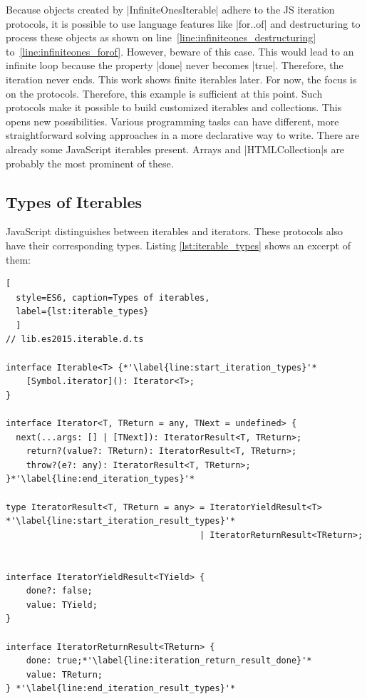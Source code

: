 Because objects created by |InfiniteOnesIterable| adhere to the JS iteration
protocols, it is possible to use language features like |for..of| and
destructuring to process these objects as shown on
line~\ref{line:infiniteones_destructuring} to~\ref{line:infiniteones_forof}.
However, beware of this case. This would lead to an infinite loop because the
property |done| never becomes |true|. Therefore, the iteration never ends. This
work shows finite iterables later. For now, the focus is on the protocols.
Therefore, this example is sufficient at this point.
\newline
Such protocols make it possible to build customized iterables and
collections. This opens new possibilities. Various programming tasks can have 
different, more straightforward solving approaches in a more declarative way to
write.
There are already some JavaScript iterables present. Arrays and
|HTMLCollection|s are probably the most prominent of these.

\subsection{Types of Iterables}
\label{sub:Types of Iterables}
JavaScript distinguishes between iterables and iterators. These
protocols also have their corresponding types. Listing \ref{lst:iterable_types}
shows an excerpt of them:

\begin{lstlisting}[
  style=ES6, caption=Types of iterables,
  label={lst:iterable_types}
  ]
// lib.es2015.iterable.d.ts

interface Iterable<T> {*'\label{line:start_iteration_types}'*
    [Symbol.iterator](): Iterator<T>;
}

interface Iterator<T, TReturn = any, TNext = undefined> {
  next(...args: [] | [TNext]): IteratorResult<T, TReturn>;
    return?(value?: TReturn): IteratorResult<T, TReturn>;
    throw?(e?: any): IteratorResult<T, TReturn>;
}*'\label{line:end_iteration_types}'*

type IteratorResult<T, TReturn = any> = IteratorYieldResult<T> *'\label{line:start_iteration_result_types}'*
                                      | IteratorReturnResult<TReturn>;


interface IteratorYieldResult<TYield> {
    done?: false;
    value: TYield;
}

interface IteratorReturnResult<TReturn> {
    done: true;*'\label{line:iteration_return_result_done}'*
    value: TReturn;
} *'\label{line:end_iteration_result_types}'*
\end{lstlisting}

